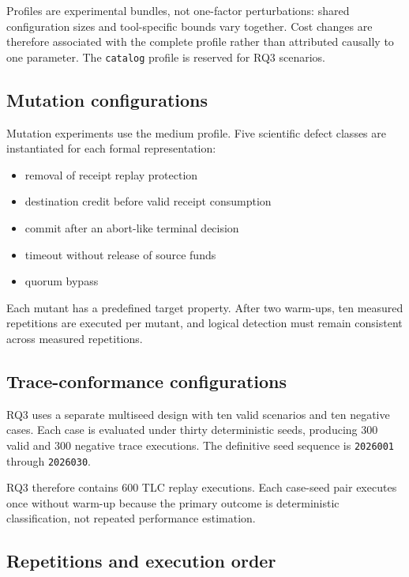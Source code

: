 Profiles are experimental bundles, not one-factor perturbations: shared
configuration sizes and tool-specific bounds vary together. Cost changes are
therefore associated with the complete profile rather than attributed causally
to one parameter. The \texttt{catalog} profile is reserved for RQ3 scenarios.

\subsection{Mutation configurations}
\label{subsec:mutation-configurations}

Mutation experiments use the medium profile. Five scientific defect classes are
instantiated for each formal representation:

\begin{itemize}
\item removal of receipt replay protection
\item destination credit before valid receipt consumption
\item commit after an abort-like terminal decision
\item timeout without release of source funds
\item quorum bypass
\end{itemize}

Each mutant has a predefined target property. After two warm-ups, ten measured
repetitions are executed per mutant, and logical detection must remain
consistent across measured repetitions.

\subsection{Trace-conformance configurations}
\label{subsec:trace-configurations}

RQ3 uses a separate multiseed design with ten valid scenarios and ten negative
cases. Each case is evaluated under thirty deterministic seeds, producing
300 valid and 300 negative trace executions. The definitive seed sequence is
\texttt{2026001} through \texttt{2026030}.

RQ3 therefore contains 600 TLC replay executions. Each case-seed pair executes
once without warm-up because the primary outcome is deterministic
classification, not repeated performance estimation.

\subsection{Repetitions and execution order}
\label{subsec:repetitions}

